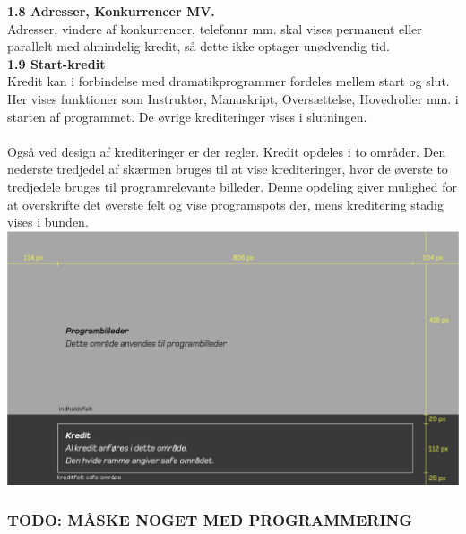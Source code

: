 \textbf{1.8 Adresser, Konkurrencer MV.} \\
Adresser, vindere af konkurrencer, telefonnr mm. skal vises permanent eller parallelt med almindelig kredit, så dette ikke optager unødvendig tid. \\

\textbf{1.9 Start-kredit} \\
Kredit kan i forbindelse med dramatikprogrammer fordeles mellem start og slut. Her vises funktioner som Instruktør, Manuskript, Oversættelse, Hovedroller mm. i starten af programmet. De øvrige krediteringer vises i slutningen. \\

 \\
Også ved design af krediteringer er der regler. Kredit opdeles i to områder. Den nederste tredjedel af skærmen bruges til at vise krediteringer, hvor de øverste to tredjedele bruges til programrelevante billeder. Denne opdeling giver mulighed for at overskrifte det øverste felt og vise programspots der, mens kreditering stadig vises i bunden. \\
\includegraphics[scale=0.42]{figures/2. Faglig vidensgrundlag/Kredit Design.png}

\subsubsection{TODO: MÅSKE NOGET MED PROGRAMMERING}